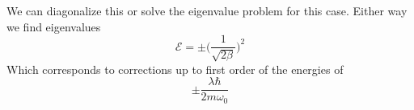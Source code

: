 \documentclass[12pt]{article}
\begin{document}
\begin{enumerate}
    We can diagonalize this or solve the eigenvalue problem for this case. Either way we find eigenvalues 
    $$ \mathcal{E} = \pm \Big( \frac{1}{\sqrt{2 \beta} } \Big)^2 $$
    Which corresponds to corrections up to first order of the energies of 
    $$ \pm \frac{\lambda \hbar}{2 m \omega_0} $$
\end{enumerate}
\end{document}
